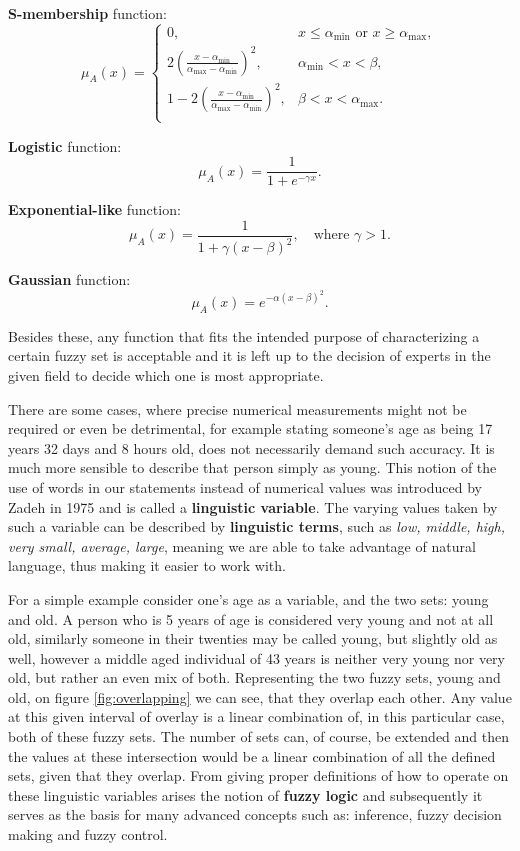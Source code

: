 \textbf{S-membership} function:
\[
	\mu_{A}(x) =
		\begin{cases}
			0, &x \leq \alpha_{\min} \text{ or } x \geq \alpha_{\max},\\
			2 {\left( \frac{x - \alpha_{\min}}{\alpha_{\max} - \alpha_{\min}} \right)}^2, &\alpha_{\min} < x < \beta,\\
			1 - 2 {\left( \frac{x - \alpha_{\min}}{\alpha_{\max} - \alpha_{\min}} \right)}^2, &\beta < x < \alpha_{\max}.\\
		\end{cases}
\]

\textbf{Logistic} function:
\[
	\mu_{A}(x) = \frac{1}{1 + e^{-\gamma x}}.
\]

\textbf{Exponential-like} function:
\[
	\mu_{A}(x) = \frac{1}{1 + \gamma(x - \beta)^2}, \quad \text{where }\gamma > 1.
\]

\textbf{Gaussian} function:
\[
	\mu_{A}(x) = e^{-\alpha (x - \beta)^2}.
\]

Besides these, any function that fits the intended purpose of characterizing a certain fuzzy set is acceptable and it is left up to the decision of experts in the given field to decide which one is most appropriate.


There are some cases, where precise numerical measurements might not be required or even be detrimental, for example stating someone's age as being 17 years 32 days and 8 hours old, does not necessarily demand such accuracy. It is much more sensible to describe that person simply as young. This notion of the use of words in our statements instead of numerical values was introduced by Zadeh in 1975 and is called a \textbf{linguistic variable}. The varying values taken by such a variable can be described by \textbf{linguistic terms}, such as \textit{low, middle, high, very small, average, large}, meaning we are able to take advantage of natural language, thus making it easier to work with.

For a simple example consider one's age as a variable, and the two sets: young and old. A person who is 5 years of age is considered very young and not at all old, similarly someone in their twenties may be called young, but slightly old as well, however a middle aged individual of 43 years is neither very young nor very old, but rather an even mix of both. Representing the two fuzzy sets, young and old, on figure \ref{fig:overlapping} we can see, that they overlap each other. Any value at this given interval of overlay is a linear combination of, in this particular case, both of these fuzzy sets. The number of sets can, of course, be extended and then the values at these intersection would be a linear combination of all the defined sets, given that they overlap. From giving proper definitions of how to operate on these linguistic variables arises the notion of \textbf{fuzzy logic} and subsequently it serves as the basis for many advanced concepts such as: inference, fuzzy decision making and fuzzy control.

